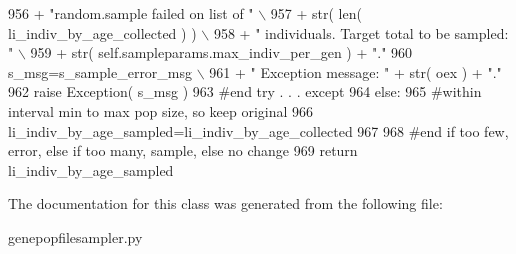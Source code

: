 \begin{DoxyCode}
956                         + \textcolor{stringliteral}{"random.sample failed on list of "} \(\backslash\)
957                         + str( len( li\_indiv\_by\_age\_collected ) ) \(\backslash\)
958                         + \textcolor{stringliteral}{" individuals.  Target total to be sampled: "} \(\backslash\)
959                         + str( self.sampleparams.max\_indiv\_per\_gen ) + \textcolor{stringliteral}{"."}
960                 s\_msg=s\_sample\_error\_msg \(\backslash\)
961                         + \textcolor{stringliteral}{"  Exception message: "} + str( oex ) + \textcolor{stringliteral}{"."}
962                 \textcolor{keywordflow}{raise} Exception( s\_msg )
963             \textcolor{comment}{#end try . . . except}
964         \textcolor{keywordflow}{else}:
965             \textcolor{comment}{#within interval min to max pop size, so keep original }
966             li\_indiv\_by\_age\_sampled=li\_indiv\_by\_age\_collected
967 
968         \textcolor{comment}{#end if too few, error, else if too many, sample, else no change}
969         \textcolor{keywordflow}{return} li\_indiv\_by\_age\_sampled
\end{DoxyCode}


The documentation for this class was generated from the following file\+:\begin{DoxyCompactItemize}
\item 
genepopfilesampler.\+py\end{DoxyCompactItemize}
